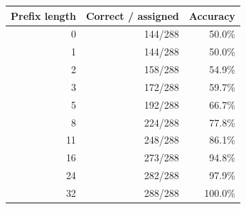 \begin{tabular}{rrr}\toprule
Prefix length & Correct / assigned & Accuracy\\\midrule
0 & 144/288 & 50.0\%\\
1 & 144/288 & 50.0\%\\
2 & 158/288 & 54.9\%\\
3 & 172/288 & 59.7\%\\
5 & 192/288 & 66.7\%\\
8 & 224/288 & 77.8\%\\
11 & 248/288 & 86.1\%\\
16 & 273/288 & 94.8\%\\
24 & 282/288 & 97.9\%\\
32 & 288/288 & 100.0\%\\
\bottomrule\end{tabular}
